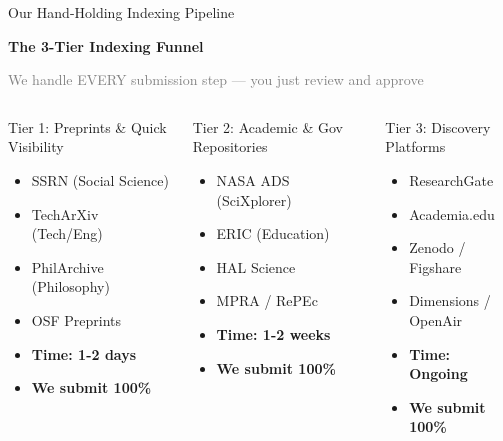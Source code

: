 \documentclass[10pt, aspectratio=169]{beamer}
\begin{document}
	\begin{frame}{Our Hand-Holding Indexing Pipeline}
		\begin{center}
			\Large{\textbf{The 3-Tier Indexing Funnel}}
			
			\vspace{0.2cm}
			\tiny{\textcolor{gray}{We handle EVERY submission step — you just review and approve}}
		\end{center}
		
		\vspace{0.3cm}
		\begin{columns}[T]
			\begin{block}{\textcolor{myblue}{Tier 1: Preprints \& Quick Visibility}}
				\tiny
				\begin{itemize}
					\item SSRN (Social Science)
					\item TechArXiv (Tech/Eng)
					\item PhilArchive (Philosophy)
					\item OSF Preprints
					\item \textbf{Time: 1-2 days}
					\item \textcolor{mygreen}{\textbf{We submit 100\%}}
				\end{itemize}
			\end{block}
			
			\begin{block}{\textcolor{myblue}{Tier 2: Academic \& Gov Repositories}}
				\tiny
				\begin{itemize}
					\item NASA ADS (SciXplorer)
					\item ERIC (Education)
					\item HAL Science
					\item MPRA / RePEc
					\item \textbf{Time: 1-2 weeks}
					\item \textcolor{mygreen}{\textbf{We submit 100\%}}
				\end{itemize}
			\end{block}
			
			\begin{block}{\textcolor{myblue}{Tier 3: Discovery Platforms}}
				\tiny
				\begin{itemize}
					\item ResearchGate
					\item Academia.edu
					\item Zenodo / Figshare
					\item Dimensions / OpenAir
					\item \textbf{Time: Ongoing}
					\item \textcolor{mygreen}{\textbf{We submit 100\%}}
				\end{itemize}
			\end{block}
		\end{columns}
		

\end{frame}
\end{document}
